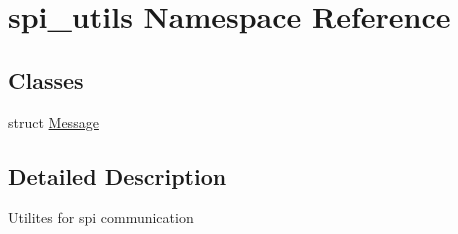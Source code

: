 \hypertarget{namespacespi__utils}{}\section{spi\+\_\+utils Namespace Reference}
\label{namespacespi__utils}
\subsection*{Classes}
\begin{DoxyCompactItemize}
\item 
struct \mbox{\hyperlink{structspi__utils_1_1Message}{Message}}
\end{DoxyCompactItemize}


\subsection{Detailed Description}
Utilites for spi communication 